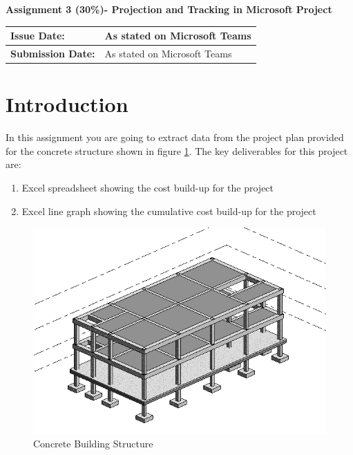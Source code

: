 


\begin{flushleft}
\Large\textbf{Assignment 3 (30\%)- Projection and Tracking in Microsoft Project}\\
\end{flushleft}



\begin{tabularx}{\textwidth}{ |X|X| }
	\hline
	\textbf{Issue Date:} & As stated on Microsoft Teams \\
	\hline 
	\textbf{Submission Date:}  & As stated on Microsoft Teams  \\
	\hline
\end{tabularx}

\section*{Introduction}

In this assignment you are going to extract data from the project plan provided for the concrete structure shown in figure \ref{fig:building}.  The key deliverables for this project are:

\begin{enumerate}
	\item Excel spreadsheet showing the cost build-up for the project 
	\item Excel line graph showing the cumulative cost build-up for the project 
\end{enumerate}


\begin{figure}[b]
	\centering
	\includegraphics[width=1.0\linewidth]{./img/Building}
	\caption{Concrete Building Structure}
	\label{fig:building}
\end{figure}




